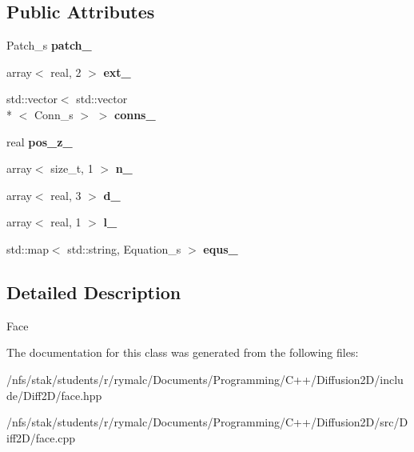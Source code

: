 \subsection*{Public Attributes}
\begin{DoxyCompactItemize}
\item 
\hypertarget{classFace_a2e53c055a4d8492b42995db563e1fc7a}{Patch\+\_\+s {\bfseries patch\+\_\+}}\label{classFace_a2e53c055a4d8492b42995db563e1fc7a}

\item 
\hypertarget{classFace_a0922668c4175d0274024a5869b310a63}{array$<$ real, 2 $>$ {\bfseries ext\+\_\+}}\label{classFace_a0922668c4175d0274024a5869b310a63}

\item 
\hypertarget{classFace_ac831a8581fa641c54f4adb6e6b3dfe71}{std\+::vector$<$ std\+::vector\\*
$<$ Conn\+\_\+s $>$ $>$ {\bfseries conns\+\_\+}}\label{classFace_ac831a8581fa641c54f4adb6e6b3dfe71}

\item 
\hypertarget{classFace_a639f6d684b3a55d69528b5b6f5976937}{real {\bfseries pos\+\_\+z\+\_\+}}\label{classFace_a639f6d684b3a55d69528b5b6f5976937}

\item 
\hypertarget{classFace_af798b428f231a2f7fad13a386a5c4d7f}{array$<$ size\+\_\+t, 1 $>$ {\bfseries n\+\_\+}}\label{classFace_af798b428f231a2f7fad13a386a5c4d7f}

\item 
\hypertarget{classFace_a7d41239f934e8819874b5fb515d43380}{array$<$ real, 3 $>$ {\bfseries d\+\_\+}}\label{classFace_a7d41239f934e8819874b5fb515d43380}

\item 
\hypertarget{classFace_a75033fb2521fcb2c613782f831f42bb3}{array$<$ real, 1 $>$ {\bfseries l\+\_\+}}\label{classFace_a75033fb2521fcb2c613782f831f42bb3}

\item 
\hypertarget{classFace_a46b37a1eaba00ad44cf46b6da1391b30}{std\+::map$<$ std\+::string, Equation\+\_\+s $>$ {\bfseries equs\+\_\+}}\label{classFace_a46b37a1eaba00ad44cf46b6da1391b30}

\end{DoxyCompactItemize}


\subsection{Detailed Description}
Face 

The documentation for this class was generated from the following files\+:\begin{DoxyCompactItemize}
\item 
/nfs/stak/students/r/rymalc/\+Documents/\+Programming/\+C++/\+Diffusion2\+D/include/\+Diff2\+D/face.\+hpp\item 
/nfs/stak/students/r/rymalc/\+Documents/\+Programming/\+C++/\+Diffusion2\+D/src/\+Diff2\+D/face.\+cpp\end{DoxyCompactItemize}
